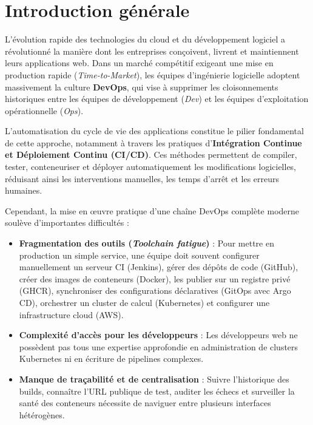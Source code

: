 \documentclass[12pt,a4paper,oneside]{report}
\begin{document}
\tableofcontents
\clearpage
\listoffigures
\clearpage
\listoftables
\clearpage

\chapter*{Introduction générale}

L'évolution rapide des technologies du cloud et du développement logiciel a révolutionné la manière dont les entreprises conçoivent, livrent et maintiennent leurs applications web. Dans un marché compétitif exigeant une mise en production rapide (\textit{Time-to-Market}), les équipes d'ingénierie logicielle adoptent massivement la culture \textbf{DevOps}, qui vise à supprimer les cloisonnements historiques entre les équipes de développement (\textit{Dev}) et les équipes d'exploitation opérationnelle (\textit{Ops}).

L'automatisation du cycle de vie des applications constitue le pilier fondamental de cette approche, notamment à travers les pratiques d'\textbf{Intégration Continue et Déploiement Continu (CI/CD)}. Ces méthodes permettent de compiler, tester, conteneuriser et déployer automatiquement les modifications logicielles, réduisant ainsi les interventions manuelles, les temps d'arrêt et les erreurs humaines.

Cependant, la mise en œuvre pratique d'une chaîne DevOps complète moderne soulève d'importantes difficultés :
\begin{itemize}[label=$\bullet$]
    \item \textbf{Fragmentation des outils (\textit{Toolchain fatigue})} : Pour mettre en production un simple service, une équipe doit souvent configurer manuellement un serveur CI (Jenkins), gérer des dépôts de code (GitHub), créer des images de conteneurs (Docker), les publier sur un registre privé (GHCR), synchroniser des configurations déclaratives (GitOps avec Argo CD), orchestrer un cluster de calcul (Kubernetes) et configurer une infrastructure cloud (AWS).
    \item \textbf{Complexité d'accès pour les développeurs} : Les développeurs web ne possèdent pas tous une expertise approfondie en administration de clusters Kubernetes ni en écriture de pipelines complexes.
    \item \textbf{Manque de traçabilité et de centralisation} : Suivre l'historique des builds, connaître l'URL publique de test, auditer les échecs et surveiller la santé des conteneurs nécessite de naviguer entre plusieurs interfaces hétérogènes.
\end{itemize}
\end{document}
